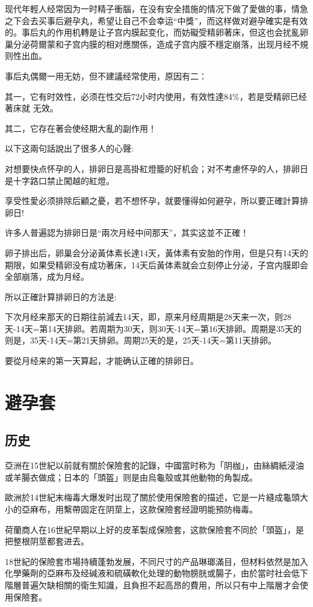 \documentclass[12pt,UTF8]{ctexbook}
\begin{document}
现代年輕人经常因为一时精子衝腦，在没有安全措施的情况下做了愛做的事，情急之下会去买事后避孕丸，希望让自己不会幸运“中獎”，而这样做对避孕確实是有效的。事后丸的作用机轉是让子宫内膜起变化，而妨礙受精卵著床，但这也会扰亂卵巢分泌荷爾蒙和子宫内膜的相对應關係，造成子宫内膜不穩定崩落，出现月经不規则性出血。

事后丸偶爾一用无妨，但不建議经常使用，原因有二：

其一，它有时效性，必须在性交后72小时内使用，有效性達84\%，若是受精卵已经著床就
无效。

其二，它存在著会使经期大亂的副作用！

以下这兩句話說出了很多人的心聲:

对想要快点怀孕的人，排卵日是高掛紅燈籠的好机会；对不考慮怀孕的人，排卵日是十字路口禁止闖越的紅燈。

享受性愛必须排除后顧之憂，若不想怀孕，就要懂得如何避孕，所以要正確計算排卵日!

许多人普遍認为排卵日是“兩次月经中间那天”，其实这並不正確！

卵子排出后，卵巢会分泌黃体素长達14天，黃体素有安胎的作用，但是只有14天的期限，如果受精卵没有成功著床，14天后黃体素就会立刻停止分泌，子宫内膜即会全部崩落，成为月经。

所以正確計算排卵日的方法是:

下次月经来那天的日期往前減去14天，即，原来月经周期是28天来一次，则28天-14天=第14天排卵。若周期为30天，则30天-14天=第16天排卵。周期是35天的则是，35天-14天=第21天排卵。周期25天的是，25天-14天=第11天排卵。

要從月经来的第一天算起，才能确认正確的排卵日。

\section{避孕套}

\subsection{历史}

亞洲在15世紀以前就有關於保險套的記錄，中國當时称为「阴枷」，由絲綢紙浸油或羊腸衣做成；日本的「頭盔」则是由烏龜殼或其他動物的角製成。

歐洲於14世紀末梅毒大爆发时出现了關於使用保險套的描述，它是一片縫成龜頭大小的亞麻布，用繫帶固定在阴莖上，这款保險套经證明能預防梅毒。

荷蘭商人在16世紀早期以上好的皮革製成保險套，这款保險套不同於「頭盔」，是把整根阴莖都套进去。

18世紀的保險套市場持續蓬勃发展，不同尺寸的产品琳瑯滿目，但材料依然是加入化學藥劑的亞麻布及经碱液和硫磺軟化处理的動物膀胱或腸子，由於當时社会低下階層普遍欠缺相關的衛生知識，且負担不起高昂的費用，所以只有中上階層才会使用保險套。
\end{document}

